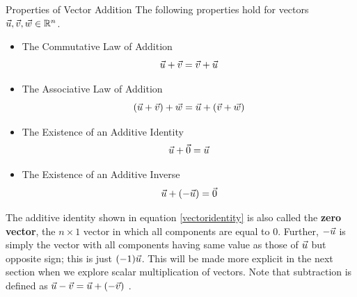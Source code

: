 \begin{theorem}{Properties of Vector Addition}\label{thm:propertiesvectoraddition}
The following properties hold for vectors $\vec{u},\vec{v}, \vec{w} \in \mathbb{R}^{n}$.
\begin{itemize}
\item The Commutative Law of Addition
\begin{equation*}
\vec{u}+\vec{v}=\vec{v}+\vec{u}
\end{equation*}
\item The Associative Law of Addition
\begin{equation*}
\left( \vec{u}+\vec{v}\right) +\vec{w}=\vec{u}+\left( \vec{v}+\vec{w}\right)
\end{equation*}
\item The Existence of an Additive Identity
\begin{equation}
\vec{u}+\vec{0}=\vec{u}
\label{vectoridentity} 
\end{equation}
\item The Existence of an Additive Inverse
\begin{equation*}
\vec{u}+\left( -\vec{u}\right) =\vec{0}  
\end{equation*}
\end{itemize}
\end{theorem}

The additive identity shown in equation
\ref{vectoridentity} is also called the \textbf{zero vector}, 
the $n \times 1$ vector in which all components are equal to $0$.
Further, $-\vec{u}$ is simply the vector with all components having
same value as those of $\vec{u}$ but opposite sign; this is just
$(-1)\vec{u}$. This will be made more explicit in the next
section when we explore scalar multiplication of vectors. Note that subtraction is defined as $\vec{u}-\vec{v} = \vec{u}+\left(
-\vec{v} \right)$ .
